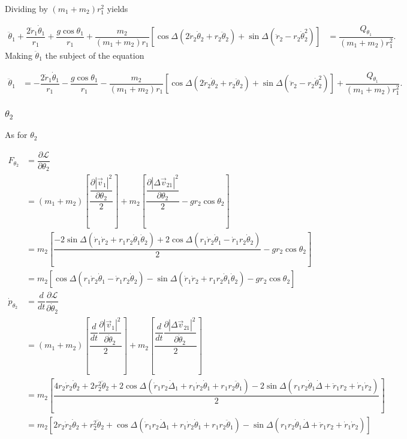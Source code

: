 \documentclass[12pt,a4paper,portrait]{article}
\newcommand{\lag}{\mathcal{L}}
\begin{document}
\begin{landscape}
Dividing by $(m_1+m_2)r_1^2$ yields

\begin{align*}
	\ddot{\theta}_1 + \dfrac{2\dot{r}_1\dot{\theta}_1}{r_1} + \dfrac{g\cos{\theta_1}}{r_1} + \dfrac{m_2}{(m_1+m_2)r_1}\left[\cos{\Delta}(2\dot{r}_2\dot{\theta}_2+r_2\ddot{\theta}_2) +\sin{\Delta}(\ddot{r}_2-r_2\dot{\theta}_2^2)\right] &= \dfrac{Q_{\theta_1}}{(m_1+m_2)r_1^2}.
\end{align*}
Making $\ddot{\theta}_1$ the subject of the equation

\begin{align}
	\ddot{\theta}_1 &= -\dfrac{2\dot{r}_1\dot{\theta}_1}{r_1} - \dfrac{g\cos{\theta_1}}{r_1} - \dfrac{m_2}{(m_1+m_2)r_1}\left[\cos{\Delta}(2\dot{r}_2\dot{\theta}_2+r_2\ddot{\theta}_2) +\sin{\Delta}(\ddot{r}_2-r_2\dot{\theta}_2^2)\right] + \dfrac{Q_{\theta_1}}{(m_1+m_2)r_1^2}. \label{theta1ddotinit}
\end{align}

\subsubsection{$\theta_2$}
As for $\theta_2$

\begin{align*}
	F_{\theta_2} &= \dfrac{\partial \lag}{\partial \theta_2} \\
	&= (m_1+m_2)\left[\dfrac{\dfrac{\partial |\vec{v}_1|^2}{\partial \theta_2}}{2}\right] + m_2\left[\dfrac{\dfrac{\partial |\Delta \vec{v}_{21}|^2}{\partial \theta_2}}{2} - gr_2\cos{\theta_2}\right] \\
	&= m_2 \left[\dfrac{-2\sin{\Delta}(\dot{r}_1\dot{r}_2 + r_1r_2\dot{\theta}_1\dot{\theta}_2) + 2\cos{\Delta}(r_1\dot{r}_2\dot{\theta}_1-\dot{r}_1r_2\dot{\theta}_2)}{2} - gr_2\cos{\theta_2}\right] \\
	&= m_2\left[\cos{\Delta}(r_1\dot{r}_2\dot{\theta}_1-\dot{r}_1r_2\dot{\theta}_2) - \sin{\Delta}(\dot{r}_1\dot{r}_2 + r_1r_2\dot{\theta}_1\dot{\theta}_2) - gr_2\cos{\theta_2}\right]\\
	\dot{p}_{\theta_2} &= \dfrac{d}{dt} \dfrac{\partial \lag}{\partial \dot{\theta}_2} \\
	&= (m_1+m_2)\left[\dfrac{\dfrac{d}{dt}\dfrac{\partial |\vec{v}_1|^2}{\partial \dot{\theta}_2}}{2}\right] + m_2\left[\dfrac{\dfrac{d}{dt}\dfrac{\partial|\Delta \vec{v}_{21}|^2}{\partial \dot{\theta}_2}}{2}\right]\\
	&= m_2 \left[\dfrac{4r_2\dot{r}_2\dot{\theta}_2 + 2r_2^2\ddot{\theta}_2 +2\cos{\Delta}(\dot{r}_1r_2\dot{\Delta}_1+r_1\dot{r}_2\dot{\theta}_1+r_1r_2\ddot{\theta}_1)-2\sin{\Delta}(r_1r_2\dot{\theta}_1\dot{\Delta} + \ddot{r}_1r_2 + \dot{r}_1\dot{r}_2)}{2}\right]\\
	&= m_2\left[2r_2\dot{r}_2\dot{\theta}_2 + r_2^2\ddot{\theta}_2 +\cos{\Delta}(\dot{r}_1r_2\dot{\Delta}_1+r_1\dot{r}_2\dot{\theta}_1+r_1r_2\ddot{\theta}_1)-\sin{\Delta}(r_1r_2\dot{\theta}_1\dot{\Delta} + \ddot{r}_1r_2 + \dot{r}_1\dot{r}_2)\right]
\end{align*}


\end{landscape}
\end{document}

